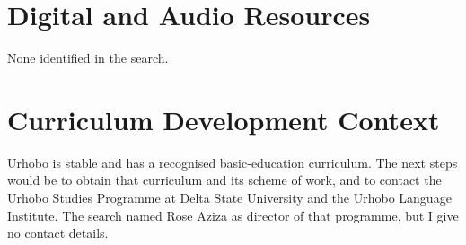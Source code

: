 \documentclass[12pt]{article}
\begin{document}
\section{Digital and Audio Resources}
None identified in the search.

\section{Curriculum Development Context}
Urhobo is stable and has a recognised basic-education curriculum. The next steps would be to obtain that curriculum and its scheme of work, and to contact the Urhobo Studies Programme at Delta State University and the Urhobo Language Institute. The search named Rose Aziza as director of that programme, but I give no contact details.
\end{document}
